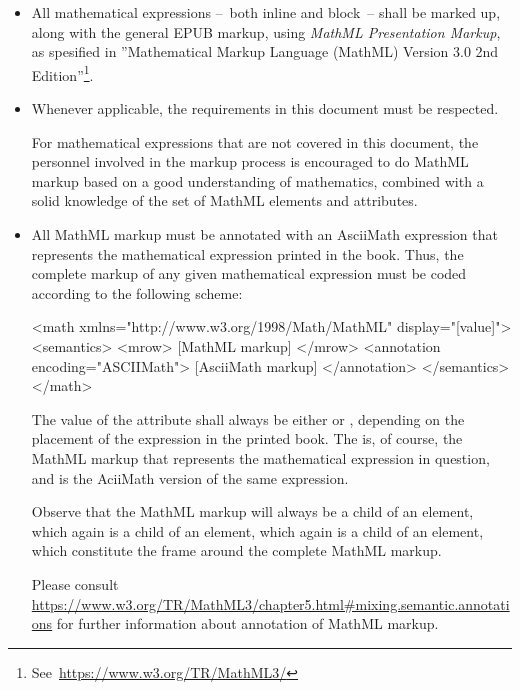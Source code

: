 \documentclass[english,a4paper,11pt]{article}
\begin{document}
\begin{itemize}
	\item All mathematical expressions --~both inline and block~-- shall be marked up, along with the general EPUB markup, using \emph{MathML Presentation Markup}, as spesified in ''Mathematical Markup Language (MathML) Version 3.0 2nd Edition''\footnote{See~\url{https://www.w3.org/TR/MathML3/}}.
	\item Whenever applicable, the requirements in this document must be respected. 
	
	For mathematical expressions that are not covered in this document, the personnel involved in the markup process is encouraged to do MathML markup based on a good understanding of mathematics, combined with a solid knowledge of the set of MathML elements and attributes.
%
	\item All MathML markup must be annotated with an AsciiMath expression that represents the mathematical expression printed in the book. Thus, the complete markup of any given mathematical expression must be coded according to the following scheme:
	
\begin{kodeblokk}
\begin{verbatimtab}[3]
<math xmlns="http://www.w3.org/1998/Math/MathML" display="[value]">
	<semantics>
		<mrow>
			[MathML markup]
		</mrow>
		<annotation encoding="ASCIIMath">
			[AsciiMath markup]
		</annotation>
	</semantics>
</math>
\end{verbatimtab}
\end{kodeblokk}
The value of the  attribute shall always be either  or , depending on the placement of the expression in the printed book. The  is, of course, the MathML markup that represents the mathematical expression in question, and  is the AciiMath version of the same expression.

Observe that the MathML markup will always be a child of an  element, which again is a child of an  element, which again is a child of an  element, which constitute the frame around the complete MathML markup.

\bigskip
Please consult \url{https://www.w3.org/TR/MathML3/chapter5.html#mixing.semantic.annotations} for further information about annotation of MathML markup.
\end{itemize}
\end{document}
